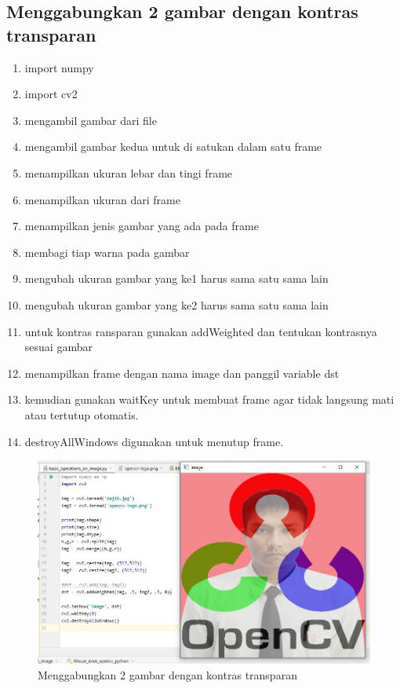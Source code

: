 \newpage
\subsection{Menggabungkan 2 gambar dengan kontras transparan}

\begin{enumerate}
	\item import numpy
	\item import cv2
	\item mengambil gambar dari file 
	\item mengambil gambar kedua untuk di satukan dalam satu frame
	\item menampilkan ukuran lebar dan tingi frame
	\item menampilkan ukuran dari frame
	\item menampilkan jenis gambar yang ada pada frame
	\item membagi tiap warna pada gambar
	\item mengubah ukuran gambar yang ke1 harus sama satu sama lain
	\item mengubah ukuran gambar yang ke2 harus sama satu sama lain
	\item untuk kontras ransparan gunakan addWeighted dan tentukan kontrasnya sesuai gambar
	\item menampilkan frame dengan nama image dan panggil variable dst
	\item kemudian gunakan waitKey untuk membuat frame agar tidak langsung mati atau tertutup otomatis.
	\item destroyAllWindows digunakan untuk menutup frame.
\end{enumerate}

\newpage
\begin{figure}[ht]
\centering
\includegraphics[scale=0.5]{figures/2,29.jpg}
\caption{Menggabungkan 2 gambar dengan kontras transparan}
\label{contoh}
\end{figure}



